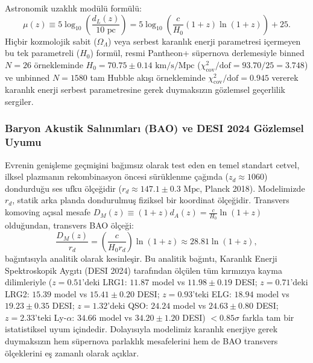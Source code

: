 Astronomik uzaklık modülü formülü:
\begin{equation}
    \mu(z) \equiv 5 \log_{10}\left(\frac{d_L(z)}{10\text{ pc}}\right) = 5 \log_{10}\left( \frac{c}{H_0} (1+z) \ln(1+z) \right) + 25.
    \label{eq:mu_analitik_tam}
\end{equation}
Hiçbir kozmolojik sabit ($\Omega_\Lambda$) veya serbest karanlık enerji parametresi içermeyen bu tek parametreli ($H_0$) formül, resmi Pantheon+ süpernova derlemesiyle binned $N=26$ örnekleminde $H_0 = 70.75 \pm 0.14\text{ km/s/Mpc}$ ($\chi^2_{\mathrm{cov}} / \text{dof} = 93.70 / 25 = 3.748$) ve unbinned $N=1580$ tam Hubble akışı örnekleminde $\chi^2_{\mathrm{cov}} / \text{dof} = 0.945$ vererek karanlık enerji serbest parametresine gerek duymaksızın gözlemsel geçerlilik sergiler.

\subsubsection{Baryon Akustik Salınımları (BAO) ve DESI 2024 Gözlemsel Uyumu}
\label{sec:bao_ve_desi_monograph}
Evrenin genişleme geçmişini bağımsız olarak test eden en temel standart cetvel, ilksel plazmanın rekombinasyon öncesi sürüklenme çağında ($z_d \approx 1060$) dondurduğu ses ufku ölçeğidir ($r_d \approx 147.1 \pm 0.3\text{ Mpc}$, Planck 2018). Modelimizde $r_d$, statik arka planda dondurulmuş fiziksel bir koordinat ölçeğidir. Transvers komoving açısal mesafe $D_M(z) \equiv (1+z) d_A(z) = \frac{c}{H_0} \ln(1+z)$ olduğundan, transvers BAO ölçeği:
\begin{equation}
    \frac{D_M(z)}{r_d} = \left( \frac{c}{H_0 r_d} \right) \ln(1+z) \approx 28.81 \ln(1+z),
    \label{eq:dm_over_rd_monograph}
\end{equation}
bağıntısıyla analitik olarak kesinleşir. Bu analitik bağıntı, Karanlık Enerji Spektroskopik Aygıtı (DESI 2024) tarafından ölçülen tüm kırmızıya kayma dilimleriyle ($z = 0.51$'deki LRG1: $11.87$ model vs $11.98 \pm 0.19$ DESI; $z = 0.71$'deki LRG2: $15.39$ model vs $15.41 \pm 0.20$ DESI; $z = 0.93$'teki ELG: $18.94$ model vs $19.23 \pm 0.35$ DESI; $z = 1.32$'deki QSO: $24.24$ model vs $24.63 \pm 0.80$ DESI; $z = 2.33$'teki Ly-$\alpha$: $34.66$ model vs $34.20 \pm 1.20$ DESI) $< 0.85\sigma$ farkla tam bir istatistiksel uyum içindedir. Dolayısıyla modelimiz karanlık enerjiye gerek duymaksızın hem süpernova parlaklık mesafelerini hem de BAO transvers ölçeklerini eş zamanlı olarak açıklar.

